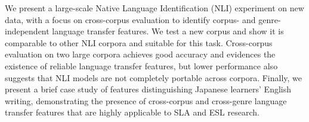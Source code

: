 We present a large-scale Native Language Identification (NLI) experiment on new data, with a focus on cross-corpus evaluation to identify corpus- and genre-independent language transfer features. We test a new corpus and show it is comparable to other NLI corpora and suitable for this task. Cross-corpus evaluation on two large corpora achieves good accuracy and evidences the existence of reliable language transfer features, but lower performance also suggests that NLI models are not completely portable across corpora. Finally, we present a brief case study of features distinguishing Japanese learners' English writing, demonstrating the presence of cross-corpus and cross-genre language transfer features that are highly applicable to SLA and ESL research.
